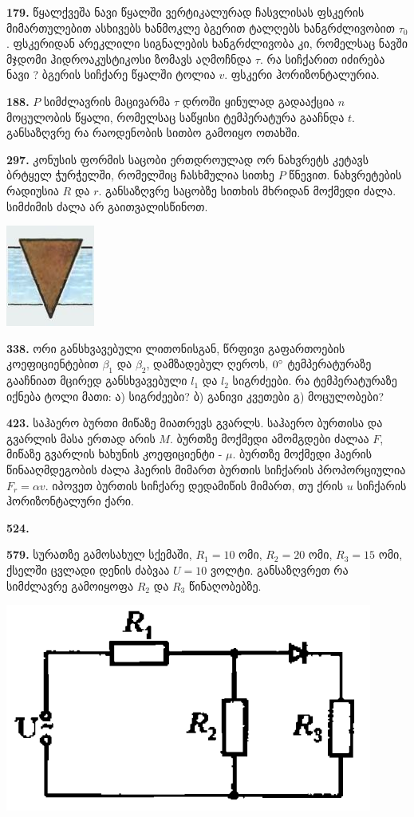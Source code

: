 \documentclass[12pt,a4paper,]{report}
\begin{document}
\textbf{179.} წყალქვეშა ნავი წყალში ვერტიკალურად ჩასვლისას ფსკერის მიმართულებით ასხივებს ხანმოკლე ბგერით ტალღებს ხანგრძლივობით $\tau_0$. ფსკერიდან არეკლილი სიგნალების ხანგრძლივობა კი, რომელსაც ნავში მჯდომი ჰიდროაკუსტიკოსი ზომავს აღმოჩნდა $\tau$. რა სიჩქარით იძირება ნავი ? ბგერის სიჩქარე წყალში ტოლია $v$. ფსკერი ჰორიზონტალურია.

\textbf{188.} $P$ სიმძლავრის მაცივარმა $\tau$ დროში ყინულად გადააქცია $n$ მოცულობის წყალი, რომელსაც საწყისი ტემპერატურა გააჩნდა $t$. განსაზღვრე რა რაოდენობის სითბო გამოიყო ოთახში.
 
\textbf{297.} კონუსის ფორმის საცობი ერთდროულად ორ ნახვრეტს კეტავს ბრტყელ ჭურჭელში, რომელშიც ჩასხმულია სითხე $P$ წნევით.  ნახვრეტების რადიუსია $R$ და $r$. განსაზღვრე საცობზე სითხის მხრიდან მოქმედი ძალა. სიმძიმის ძალა არ გაითვალისწინოთ.
		\begin{center}
			\includegraphics[scale=0.5]{images/F297.jpg}
		\end{center}

\textbf{338.} ორი განსხვავებული ლითონისგან, წრფივი გაფართოების კოეფიციენტებით $\beta_1$ და $\beta_2$, დამზადებულ ღეროს, $0\degree$ ტემპერატურაზე გააჩნიათ მცირედ განსხვავებული $l_1$ და $l_2$ სიგრძეები. რა ტემპერატურაზე იქნება ტოლი მათი: ა) სიგრძეები? ბ) განივი კვეთები გ) მოცულობები?

\textbf{423.} საჰაერო ბურთი მიწაზე მიათრევს გვარლს. საჰაერო ბურთისა და გვარლის მასა ერთად არის $M$. ბურთზე მოქმედი ამომგდები ძალაა $F$, მიწაზე გვარლის ხახუნის კოეფიციენტი - $\mu$. ბურთზე მოქმედი ჰაერის წინააღმდეგობის ძალა ჰაერის მიმართ ბურთის სიჩქარის პროპორციულია $F_r=\alpha v$. იპოვეთ ბურთის სიჩქარე დედამიწის მიმართ, თუ ქრის $u$ სიჩქარის ჰორიზონტალური ქარი.

\textbf{524.} 

\textbf{579.} სურათზე გამოსახულ სქემაში, $R_1=10$ ომი, $R_2=20$ ომი, $R_3=15$ ომი, ქსელში ცვლადი დენის ძაბვაა $U=10$ ვოლტი. განსაზღვრეთ რა სიმძლავრე გამოიყოფა $R_2$ და $R_3$ წინაღობებზე. 
		\begin{center}
			\includegraphics[scale=0.5]{images/F579.png}
		\end{center}
	
\end{document}
